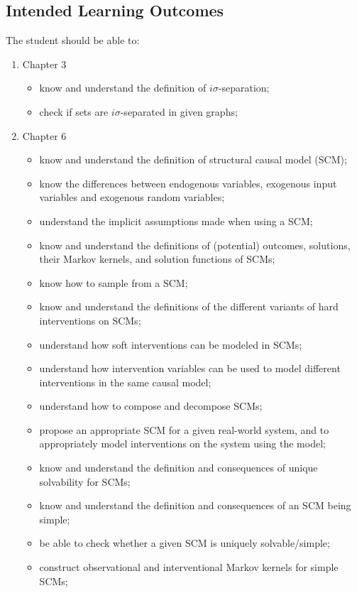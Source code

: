 \subsection*{Intended Learning Outcomes}

The student should be able to:
\begin{enumerate}
  \item Chapter 3
    \begin{itemize}
      \item know and understand the definition of $i\sigma$-separation;
      \item check if sets are $i\sigma$-separated in given graphs;
    \end{itemize}
  \item Chapter 6
    \begin{itemize}
    \item know and understand the definition of structural causal model (SCM);
    \item know the differences between endogenous variables, exogenous input variables and exogenous random variables;
    \item understand the implicit assumptions made when using a SCM;
    \item know and understand the definitions of (potential) outcomes, solutions, their Markov kernels, and solution functions of SCMs;
    \item know how to sample from a SCM;
    \item know and understand the definitions of the different variants of hard interventions on SCMs;
    \item understand how soft interventions can be modeled in SCMs;
    \item understand how intervention variables can be used to model different interventions in the same causal model;
    \item understand how to compose and decompose SCMs;
    \item propose an appropriate SCM for a given real-world system, and to appropriately model interventions on the system using the model;
    \item know and understand the definition and consequences of unique solvability for SCMs;
    \item know and understand the definition and consequences of an SCM being simple;
    \item be able to check whether a given SCM is uniquely solvable/simple;
    \item construct observational and interventional Markov kernels for simple SCMs;

\end{itemize}
\end{enumerate}
